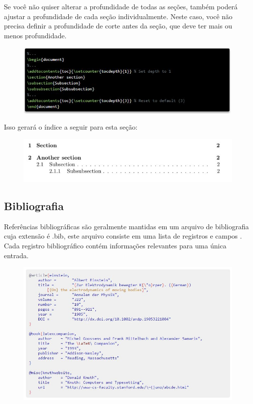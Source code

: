\documentclass[12pt]{article}
\begin{document}
			Se você não quiser alterar a profundidade de todas as seções, também poderá ajustar a profundidade de cada seção individualmente. Neste caso, você não precisa definir a profundidade de corte antes da seção, que deve ter mais ou menos profundidade.
			\begin{figure} [h]
				\centering
				\includegraphics[scale=0.9]{33.JPG}
			\end{figure}
			
			Isso gerará o índice a seguir para esta seção:
			\begin{figure} [h]
				\centering
				\includegraphics[scale=0.9]{34.JPG}
			\end{figure}
			\pagebreak
		
		\subsection{Bibliografia}
			Referências bibliográficas são geralmente mantidas em um arquivo de bibliografia cuja extensão é .bib, este arquivo consiste em uma lista de registros e campos . Cada registro bibliográfico contém informações relevantes para uma única entrada.
			\begin{figure} [h]
				\centering
				\includegraphics[scale=0.9]{35.JPG}
			\end{figure}
			\pagebreak
			
\end{document}
